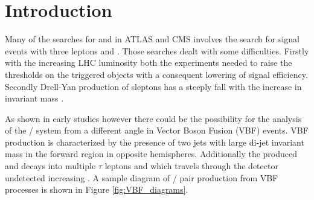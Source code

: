 \section {Introduction}

Many of the searches for \charginopm and \neutralinotwo in ATLAS \cite{Aad:2012hba, ATLAS:2012ab} and CMS \cite{Chatrchyan:2012mea} involves the search for signal events with three leptons and \met. Those searches dealt with some difficulties. Firstly with the increasing LHC luminosity both the experiments needed to raise the \pt thresholds on the triggered objects with a consequent lowering of signal efficiency. Secondly Drell-Yan production of sleptons has a steeply fall with the increase in invariant mass \cite{Baer:1997nh}.

As shown in early studies however there could be the possibility for the analysis of the \charginopm / \neutralinotwo system from a different angle  in Vector Boson Fusion (VBF) events\cite{Bjorken:1992er}. VBF production is characterized by the presence of two jets with large di-jet invariant mass in the forward region in opposite hemispheres. Additionally the produced \charginopm and \neutralinotwo decays into multiple $\tau$ leptons and \neutralinoone which travels through the detector undetected increasing \met. A sample diagram of \charginopm / \neutralinotwo pair production from VBF processes is shown in Figure \ref{fig:VBF_diagrams}. 

